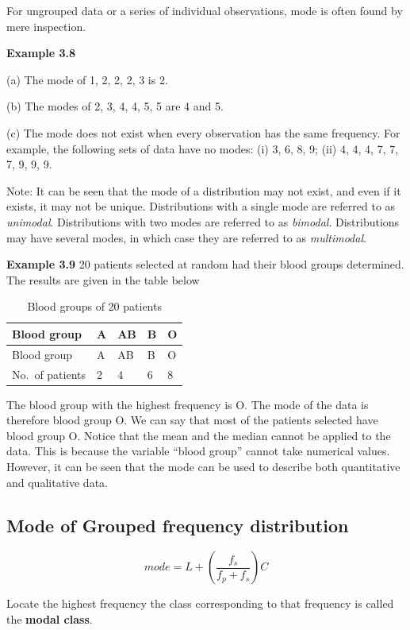 \documentclass[
]{book}
\begin{document}
For ungrouped data or a series of individual observations, mode is often
found by mere inspection.

\textbf{Example 3.8}

(a) The mode of 1, 2, 2, 2, 3 is 2.

(b) The modes of 2, 3, 4, 4, 5, 5 are 4 and 5.

(c) The mode does not exist when every observation has the same frequency. For example, the following sets of data have no modes: (i) 3,
6, 8, 9; (ii) 4, 4, 4, 7, 7, 7, 9, 9, 9.

Note: It can be seen that the mode of a distribution may not exist, and
even if it exists, it may not be unique. Distributions with a single
mode are referred to as \emph{unimodal}. Distributions with two modes are
referred to as \emph{bimodal}. Distributions may have several modes, in which
case they are referred to as \emph{multimodal}.

\textbf{Example 3.9} 20 patients selected at random had their blood groups
determined. The results are given in the table below

\begin{longtable}[]{@{}lllll@{}}
\caption{\label{tab:Blood} Blood groups of 20 patients}\tabularnewline
\toprule
Blood group & A & AB & B & O \\
\midrule
\endfirsthead
\toprule
Blood group & A & AB & B & O \\
\midrule
\endhead
No.~of patients & 2 & 4 & 6 & 8 \\
\bottomrule
\end{longtable}

The blood group with the highest frequency is O. The mode of the data is
therefore blood group O. We can say that most of the patients selected
have blood group O. Notice that the mean and the median cannot be
applied to the data. This is because the variable ``blood group'' cannot
take numerical values. However, it can be seen that the mode can be used
to describe both quantitative and qualitative data.

\hypertarget{mode-of-grouped-frequency-distribution}{%
\subsection{Mode of Grouped frequency distribution}\label{mode-of-grouped-frequency-distribution}}

\[mode = L + \left( \frac{f_{s}}{f_{p} + f_{s}} \right)C\]

Locate the highest frequency the class corresponding to that frequency
is called the \textbf{modal class}.
\end{document}

